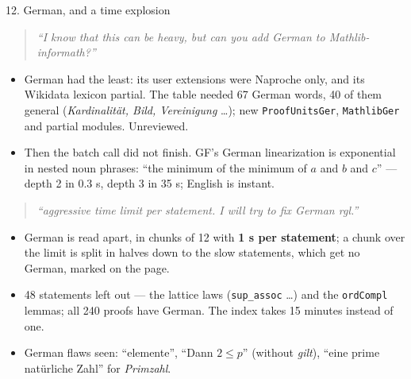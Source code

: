 \documentclass[10pt,aspectratio=169]{beamer}
\newcommand{\bad}[1]{\textcolor{warn}{#1}}
\newcommand{\prompt}[1]{\begin{quote}\small\itshape ``#1''\end{quote}}
\begin{document}
\begin{frame}{12. German, and a time explosion}
  \small
  \prompt{I know that this can be heavy, but can you add German to Mathlib-informath?}
  \begin{itemize}
    \item German had the least: its user extensions were Naproche only, and its Wikidata
          lexicon partial. The table needed 67 German words, 40 of them general
          (\emph{Kardinalität, Bild, Vereinigung} \dots); new \texttt{ProofUnitsGer},
          \texttt{MathlibGer} and partial modules. Unreviewed.
    \item Then the batch call did not finish. GF's German linearization is exponential
          in nested noun phrases: ``the minimum of the minimum of $a$ and $b$ and $c$''
          --- depth 2 in 0.3 s, depth 3 in 35 s; English is instant.
  \end{itemize}
  \prompt{aggressive time limit per statement. I will try to fix German rgl.}
  \begin{itemize}
    \item German is read apart, in chunks of 12 with \textbf{1 s per statement}; a chunk
          over the limit is split in halves down to the slow statements, which get no
          German, marked on the page.
    \item 48 statements left out --- the lattice laws (\texttt{sup\_assoc} \dots) and
          the \texttt{ordCompl} lemmas; all 240 proofs have German. The index takes
          15 minutes instead of one.
    \item German flaws seen: \bad{``elemente''}, \bad{``Dann $2 \leq p$''} (without
          \emph{gilt}), ``eine prime natürliche Zahl'' for \emph{Primzahl}.
  \end{itemize}
\end{frame}
\end{document}
